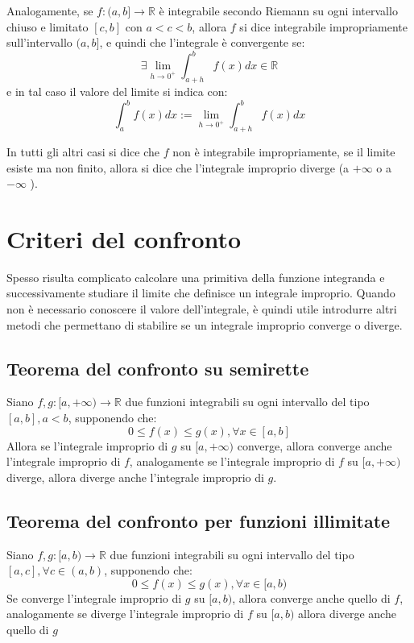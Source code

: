 \documentclass[a4paper,12pt,openright]{book}
\begin{document}
	Analogamente, se $f: (a, b] \longrightarrow \mathbb{R}$ è integrabile secondo Riemann su ogni intervallo chiuso e limitato $[c, b]$ con $a < c < b$, allora $f$ si dice integrabile impropriamente sull'intervallo $(a, b]$, e quindi che l'integrale è convergente se:
	\[\exists \lim_{h \to 0^+} \int_{a + h}^{b} f(x)dx \in \mathbb{R}\]
	e in tal caso il valore del limite si indica con:
	\[\int_{a}^{b} f(x)dx := \lim_{h \to 0^+} \int_{a + h}^{b} f(x)dx\]
	
	In tutti gli altri casi si dice che $f$ non è integrabile impropriamente, se il limite esiste ma non finito, allora si dice che l'integrale improprio diverge (a $+\infty$ o a $-\infty$ ).
	
	\section{Criteri del confronto}
	Spesso risulta complicato calcolare una primitiva della funzione integranda e successivamente studiare il limite che definisce un integrale improprio. 
	Quando non è necessario conoscere il valore dell'integrale, è quindi utile introdurre altri metodi che permettano di stabilire se un integrale improprio converge o diverge.
	
	\subsection{Teorema del confronto su semirette}
	Siano $f, g: [a, +\infty) \longrightarrow \mathbb{R}$ due funzioni integrabili su ogni intervallo del tipo $[a, b], a < b$, supponendo che:
	\[0 \leq f(x) \leq g(x), \forall x \in [a, b]\]
	Allora se l'integrale improprio di $g$ su $[a, +\infty)$ converge, allora converge anche l'integrale improprio di $f$, analogamente se l'integrale improprio di $f$ su $[a, +\infty)$ diverge, allora diverge anche l'integrale improprio di $g$.
	
	\subsection{Teorema del confronto per funzioni illimitate}
	Siano $f, g: [a, b) \longrightarrow \mathbb{R}$ due funzioni integrabili su ogni intervallo del tipo $[a, c], \forall c \in (a, b)$, supponendo che:
	\[0 \leq f(x) \leq g(x), \forall x \in [a, b)\]
	Se converge l'integrale improprio di $g$ su $[a, b)$, allora converge anche quello di $f$, analogamente se diverge l'integrale improprio di $f$ su $[a, b)$ allora diverge anche quello di $g$
	
\end{document}
